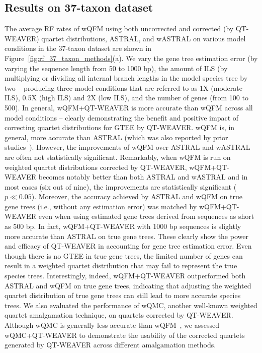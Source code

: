 \documentclass[runningheads]{llncs}
\begin{document}
\subsection{Results on 37-taxon dataset}
The average RF rates of wQFM using both uncorrected and corrected (by QT-WEAVER) quartet distributions, ASTRAL, and wASTRAL on various model conditions in the 37-taxon dataset are shown in Figure~\ref{fig:rf_37_taxon_methods}(a). %
We vary the gene tree estimation error (by varying the sequence length from 50 to 1000 bp), the amount of ILS (by multiplying or dividing all internal branch lengths in the model species tree by two -- producing three model conditions that are referred to as 1X (moderate ILS), 0.5X (high ILS) and 2X (low ILS), and the number of genes (from 100 to 500). In general, wQFM+QT-WEAVER is more accurate than wQFM across all model conditions -- clearly demonstrating the benefit and positive impact of correcting quartet distributions for GTEE by QT-WEAVER. wQFM is, in general, more accurate than ASTRAL (which was also reported by prior studies~\cite{wqfm,mahbub2022qt}). However, the improvements of wQFM over ASTRAL and wASTRAL are often not statistically significant. Remarkably, when wQFM is run on weighted quartet distributions corrected by QT-WEAVER, wQFM+QT-WEAVER becomes notably better than both ASTRAL and wASTRAL and in most cases (six out of nine), the improvements are statistically significant ($p \ll 0.05$). Moreover, the accuracy achieved by ASTRAL and wQFM on true gene trees (i.e., without any estimation error) was matched by wQFM+QT-WEAVER even when using estimated gene trees derived from sequences as short as 500 bp. In fact, wQFM+QT-WEAVER with 1000 bp sequences is slightly more accurate than ASTRAL on true gene trees. These clearly show the power and efficacy of QT-WEAVER in accounting for gene tree estimation error. %
Even though there is no GTEE in true gene trees, the limited number of genes can result in a weighted quartet distribution that may fail to represent the true species trees. 
Interestingly, indeed, wQFM+QT-WEAVER outperformed both ASTRAL and wQFM on true gene trees, indicating that adjusting the weighted quartet distribution of true gene trees can still lead to more accurate species trees. We also evaluated the performance of wQMC, another well-known weighted quartet amalgamation technique, on quartets corrected by QT-WEAVER. Although wQMC is generally less accurate than wQFM~\cite{wqfm,mahbub2022qt}, we assessed wQMC+QT-WEAVER to demonstrate the usability of the corrected quartets generated by QT-WEAVER across different amalgamation methods. %
\end{document}
